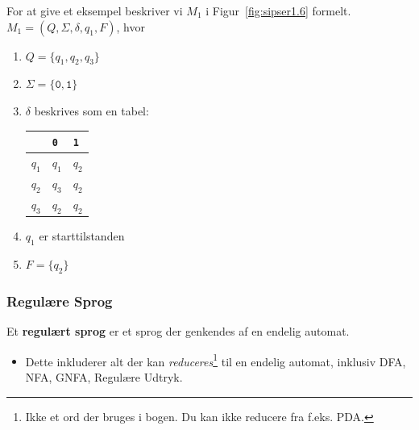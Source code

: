 \begin{frame}[allowframebreaks]
	For at give et eksempel beskriver vi $M_{1}$ i Figur~\ref{fig:sipser1.6} formelt.\\
	$M_{1} = (Q, \Sigma, \delta, q_{1}, F)$, hvor
	\begin{enumerate}
		\item $Q = \{q_{1}, q_{2}, q_{3}\}$
		\item $\Sigma = \{\mathtt{0,1}\}$
		\item $\delta$ beskrives som en tabel:
		      \begin{table}[h]
			      \centering
			      \begin{tabular}{l|ll}
				            & \texttt{0} & \texttt{1} \\ \hline
				      $q_1$ & $q_1$      & $q_2$      \\
				      $q_2$ & $q_3$      & $q_2$      \\
				      $q_3$ & $q_2$      & $q_2$
			      \end{tabular}
		      \end{table}
		\item $q_{1}$ er starttilstanden
		\item $F = \{q_{2}\}$
	\end{enumerate}
\end{frame}

\begin{frame}
	\frametitle{Regulære Sprog}
	\begin{definition}
		Et \textbf{regulært sprog} er et sprog der genkendes af en endelig automat.
	\end{definition}
	\begin{itemize}
		\item Dette inkluderer alt der kan \textit{reduceres}\footnote{Ikke et ord der bruges i bogen. Du kan ikke reducere fra f.eks. PDA.} til en endelig automat, inklusiv DFA, NFA, GNFA, Regulære Udtryk.
	\end{itemize}
\end{frame}


